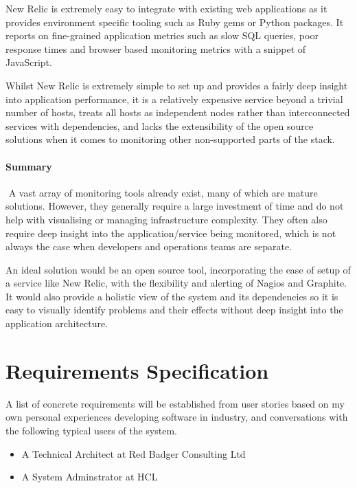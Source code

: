 \documentclass{cshonours}
\begin{document}
New Relic is extremely easy to integrate with existing web applications as it provides environment specific tooling such as Ruby gems or Python packages. It reports on fine-grained application metrics such as slow SQL queries, poor response times and browser based monitoring metrics with a snippet of JavaScript.

Whilst New Relic is extremely simple to set up and provides a fairly deep insight into application performance, it is a relatively expensive service beyond a trivial number of hosts, treats all hosts as independent nodes rather than interconnected services with dependencies, and lacks the extensibility of the open source solutions when it comes to monitoring other non-supported parts of the stack.

\subsubsection{Summary}
 A vast array of monitoring tools already exist, many of which are mature solutions. However, they generally require a large investment of time and do not help with visualising or managing infrastructure complexity. They often also require deep insight into the application/service being monitored, which is not always the case when developers and operations teams are separate.

An ideal solution would be an open source tool, incorporating the ease of setup of a service like New Relic, with the flexibility and alerting of Nagios and Graphite. It would also provide a holistic view of the system and its dependencies so it is easy to visually identify problems and their effects without deep insight into the application architecture.


\chapter{Requirements Specification}

A list of concrete requirements will be established from user stories based on my own personal experiences developing software in industry, and conversations with the following typical users of the system.

\begin{itemize}
  \item A Technical Architect at Red Badger Consulting Ltd
  \item A System Adminstrator at HCL
\end{itemize}
\end{document}
